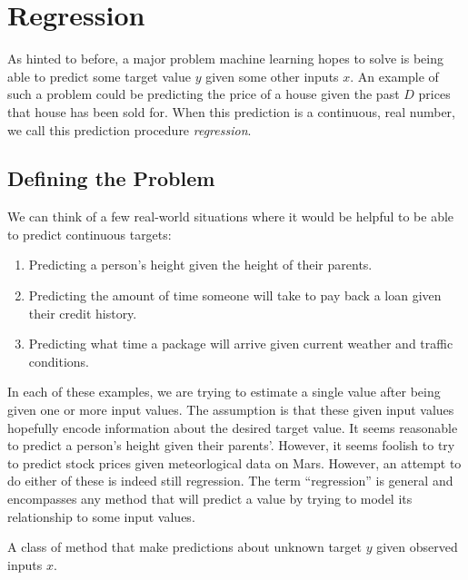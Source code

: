 \chapter{Regression}
As hinted to before, a major problem machine learning hopes to solve is being able to predict some target value $y$ given some other inputs $x$. An example of such a problem could be predicting the price of a house given the past $D$ prices that house has been sold for. When this prediction is a continuous, real number, we call this prediction procedure \emph{regression}.

\section{Defining the Problem}
We can think of a few real-world situations where it would be helpful to be able to predict continuous targets:

\begin{enumerate}
    \item Predicting a person's height given the height of their parents.
    \item Predicting the amount of time someone will take to pay back a loan given their credit history.
    \item Predicting what time a package will arrive given current weather and traffic conditions.
\end{enumerate}

In each of these examples, we are trying to estimate a single value after being given one or more input values. The assumption is that these given input values hopefully encode information about the desired target value. It seems reasonable to predict a person's height given their parents'. However, it seems foolish to try to predict stock prices given meteorlogical data on Mars. However, an attempt to do either of these is indeed still regression. The term ``regression'' is general and encompasses any method that will predict a value by trying to model its relationship to some input values.

\begin{definition}[regression]
    A class of method that make predictions about unknown target $y$ given observed inputs $x$.
\end{definition}




